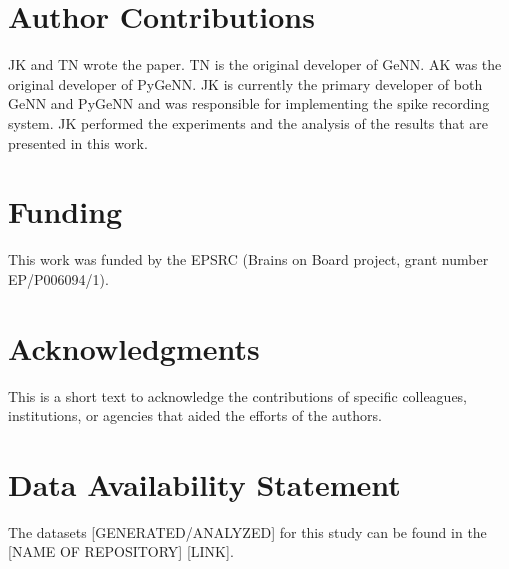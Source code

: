 \documentclass[utf8]{frontiersSCNS} %
\begin{document}
\section*{Author Contributions}
JK and TN wrote the paper.
TN is the original developer of GeNN.
AK was the original developer of PyGeNN.
JK is currently the primary developer of both GeNN and PyGeNN and was responsible for implementing the spike recording system.
JK performed the experiments and the analysis of the results that are presented in this work.

\section*{Funding}
This work was funded by the EPSRC (Brains on Board project, grant number EP/P006094/1).

\section*{Acknowledgments}
This is a short text to acknowledge the contributions of specific colleagues, institutions, or agencies that aided the efforts of the authors.

\section*{Data Availability Statement}
The datasets [GENERATED/ANALYZED] for this study can be found in the [NAME OF REPOSITORY] [LINK].


\end{document}
